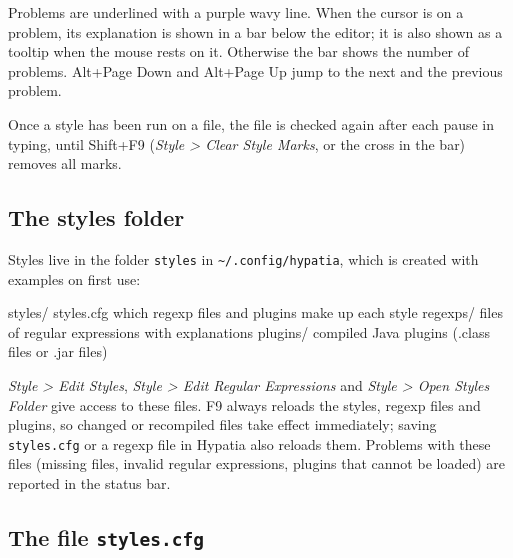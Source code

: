 \documentclass[11pt]{article}
\newcommand{\key}[1]{\textsf{#1}}
\newcommand{\menu}[1]{\textsf{\textit{#1}}}
\newcommand{\file}[1]{\texttt{#1}}
\newcommand{\cfgdir}{\texttt{\textasciitilde/.config/hypatia}}
\begin{document}
    Problems are underlined with a purple wavy line. When the cursor is on a problem, its explanation is shown in a bar below the editor; it is also shown as a tooltip when the mouse rests on it. Otherwise the bar shows the number of problems. \key{Alt+Page Down} and \key{Alt+Page Up} jump to the next and the previous problem.

    Once a style has been run on a file, the file is checked again after each pause in typing, until \key{Shift+F9} (\menu{Style > Clear Style Marks}, or the cross in the bar) removes all marks.

    \subsection{The styles folder}

    Styles live in the folder \file{styles} in \cfgdir, which is created with examples on first use:
    \begin{Code}
styles/
  styles.cfg       which regexp files and plugins make up each style
  regexps/         files of regular expressions with explanations
  plugins/         compiled Java plugins (.class files or .jar files)
    \end{Code}
    \menu{Style > Edit Styles}, \menu{Style > Edit Regular Expressions} and \menu{Style > Open Styles Folder} give access to these files. \key{F9} always reloads the styles, regexp files and plugins, so changed or recompiled files take effect immediately; saving \file{styles.cfg} or a regexp file in Hypatia also reloads them. Problems with these files (missing files, invalid regular expressions, plugins that cannot be loaded) are reported in the status bar.

    \subsection{The file \file{styles.cfg}}
\end{document}
